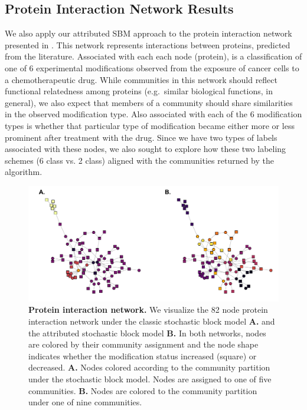 \subsection{Protein Interaction Network Results}
We also apply our attributed SBM approach to the protein interaction network presented in \cite{bonacci}. This network represents interactions between proteins, predicted from the literature. Associated with each each node (protein), is a classification of one of 6 experimental modifications observed from the exposure of cancer cells to a chemotherapeutic drug. While communities in this network should reflect functional relatedness among proteins (e.g.\ similar biological functions, in general), we also expect that members of a community should share similarities in the observed modification type. Also associated with each of the 6 modification types is whether that particular type of modification became either more or less prominent after treatment with the drug. Since we have two types of labels associated with these nodes, we also sought to explore how these two labeling schemes (6 class vs. 2 class) aligned with the communities returned by the algorithm. 

\begin{figure}[h!]
\begin{center}
\includegraphics[width=1\textwidth]{ProteinNet_Dec12.pdf}
\caption{{\bf Protein interaction network.} We visualize the 82 node protein interaction network under the classic stochastic block model {\bf A.} and the attributed stochastic block model {\bf B.} In both networks, nodes are colored by their community assignment and the node shape indicates whether the modification status increased (square) or decreased. {\bf A.} Nodes colored according to the community partition under the stochastic block model. Nodes are assigned to one of five communities. {\bf B.} Nodes are colored to the community partition under one of nine communities.}
\label{Fig7}
\end{center}
\end{figure}


